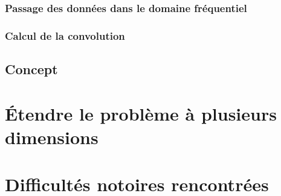\subsubsection{Passage des données dans le domaine fréquentiel}
\label{Automatisation du processus d'investigation: Reconnaissance de motifs: Différentes approches étudiées: Passage des données dans le domaine fréquentiel}

\subsubsection{Calcul de la convolution}
\label{Automatisation du processus d'investigation: Reconnaissance de motifs: Différentes approches étudiées: Calcul de la convolution}

\subsection{Concept}
\label{Automatisation du processus d'investigation: Reconnaissance de motifs: Concept}



\section{Étendre le problème à plusieurs dimensions }
\label{Automatisation du processus d'investigation: Étendre le problème à plusieurs dimensions}



\section{Difficultés notoires rencontrées}
\label{Automatisation du processus d'investigation: Difficultés notoires rencontrées}

